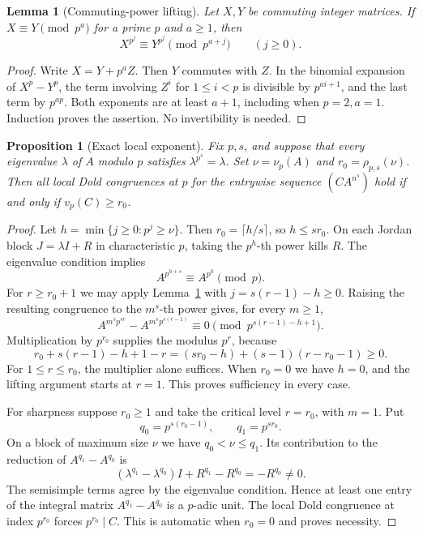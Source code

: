\documentclass[11pt]{article}
\newtheorem{proposition}[theorem]{Proposition}
\newtheorem{lemma}[theorem]{Lemma}
\theoremstyle{remark}
\begin{document}
\begin{lemma}[Commuting-power lifting]\label{lem:lifting}
Let $X,Y$ be commuting integer matrices. If $X\equiv Y\pmod{p^a}$ for a prime $p$ and $a\geq1$, then
\[
 X^{p^j}\equiv Y^{p^j}\pmod{p^{a+j}}\qquad(j\geq0).
\]
\end{lemma}
\begin{proof}
Write $X=Y+p^a Z$. Then $Y$ commutes with $Z$. In the binomial expansion of $X^p-Y^p$, the term involving $Z^i$ for $1\leq i<p$ is divisible by $p^{ai+1}$, and the last term by $p^{ap}$. Both exponents are at least $a+1$, including when $p=2,a=1$. Induction proves the assertion. No invertibility is needed.
\end{proof}

\begin{proposition}[Exact local exponent]\label{prop:localexact}
Fix $p,s$, and suppose that every eigenvalue $\lambda$ of $A$ modulo $p$ satisfies $\lambda^{p^s}=\lambda$. Set $\nu=\nu_p(A)$ and $r_0=\rho_{p,s}(\nu)$. Then all local Dold congruences at $p$ for the entrywise sequence $(C A^{n^s})$ hold if and only if $v_p(C)\geq r_0$.
\end{proposition}
\begin{proof}
Let $h=\min\{j\geq0:p^j\geq\nu\}$. Then $r_0=\lceil h/s\rceil$, so $h\leq sr_0$. On each Jordan block $J=\lambda I+R$ in characteristic $p$, taking the $p^h$-th power kills $R$. The eigenvalue condition implies
\begin{equation}\label{eq:frobenius}
 A^{p^{h+s}}\equiv A^{p^h}\pmod p.
\end{equation}
For $r\geq r_0+1$ we may apply Lemma~\ref{lem:lifting} with $j=s(r-1)-h\geq0$. Raising the resulting congruence to the $m^s$-th power gives, for every $m\geq1$,
\begin{equation}\label{eq:localbound}
 A^{m^s p^{sr}}-A^{m^s p^{s(r-1)}}
       \equiv0\pmod{p^{s(r-1)-h+1}}.
\end{equation}
Multiplication by $p^{r_0}$ supplies the modulus $p^r$, because
\[
 r_0+s(r-1)-h+1-r
   =(sr_0-h)+(s-1)(r-r_0-1)\geq0.
\]
For $1\leq r\leq r_0$, the multiplier alone suffices. When $r_0=0$ we have $h=0$, and the lifting argument starts at $r=1$. This proves sufficiency in every case.

For sharpness suppose $r_0\geq1$ and take the critical level $r=r_0$, with $m=1$. Put
\[
 q_0=p^{s(r_0-1)},\qquad q_1=p^{sr_0}.
\]
On a block of maximum size $\nu$ we have $q_0<\nu\leq q_1$. Its contribution to the reduction of $A^{q_1}-A^{q_0}$ is
\[
 (\lambda^{q_1}-\lambda^{q_0})I+R^{q_1}-R^{q_0}
      =-R^{q_0}\neq0.
\]
The semisimple terms agree by the eigenvalue condition. Hence at least one entry of the integral matrix $A^{q_1}-A^{q_0}$ is a $p$-adic unit. The local Dold congruence at index $p^{r_0}$ forces $p^{r_0}\mid C$. This is automatic when $r_0=0$ and proves necessity.
\end{proof}
\end{document}
